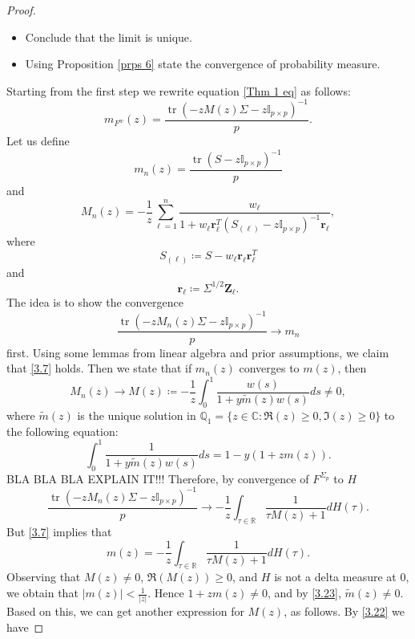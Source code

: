 \documentclass[a4paper,11pt]{book}
\theoremstyle{plain}
\theoremstyle{definition}
\newcommand{\MR}{\mathbb{R}}
\newcommand{\tr}{\operatorname{tr}}
\begin{document}
\begin{proof}
\begin{itemize}
    		\item Conclude that the limit is unique.
    		\item Using Proposition \ref{prps 6} state the convergence of probability measure.
    	\end{itemize}
    	Starting from the first step we rewrite equation \eqref{Thm 1 eq} as follows:
    	\[ m_{F^w}(z) = \frac{\tr(-zM(z)\Sigma -z\mathbb{I}_{p \times p})^{-1}}{p}. \]
    	Let us define
    	\[ m_n(z) = \frac{\tr(S-z\mathbb{I}_{p \times p})^{-1}}{p} \]
    	and
    	\[ M_n(z) = -\frac{1}{z} \sum_{\ell=1}^{n} \frac{w_\ell}{ 1+w_\ell \mathbf{r}_\ell^T (S_{(\ell)}-z\mathbb{I}_{p \times p})^{-1} \mathbf{r}_\ell},  \]
    	where
    	\[ S_{(\ell)} \coloneqq S - w_\ell \mathbf{r}_\ell \mathbf{r}_\ell^T \]
    	and 
    	\[ \mathbf{r}_\ell \coloneqq \Sigma^{1/2}\mathbf{Z}_\ell. \]
    	The idea is to show the convergence
    	\begin{equation} \label{3.7}
    	     \frac{\tr(-zM_n(z)\Sigma -z\mathbb{I}_{p \times p})^{-1}  }{p} \rightarrow m_n
    	\end{equation}
    	first. Using some lemmas from linear algebra and prior assumptions, we claim that \eqref{3.7} holds. Then we state that if $m_n(z)$ converges to $m(z)$, then
    	\begin{equation} \label{3.22}
    	 M_n(z) \rightarrow M(z) \coloneqq -\frac{1}{z} \int_{0}^{1} \frac{w(s)}{1+y\widetilde{m}(z)w(s) }ds \neq 0, 
    	\end{equation}
    	where $\widetilde{m}(z)$ is the unique solution in $\mathbb{Q}_1 = \{z \in \mathbb{C}: \Re(z) \geq 0, \Im(z) \geq 0\}$ to the following equation:
    	\begin{equation} \label{3.23}
    	\int_{0}^{1} \frac{1}{1 + y \widetilde{m}(z) w(s)} ds = 1 - y (1 + zm(z)).
    	\end{equation}
    	BLA BLA BLA EXPLAIN IT!!!
    	Therefore, by convergence of $F^{\Sigma_p}$ to $H$
    	\[ 
    	\frac{\tr(-zM_n(z)\Sigma -z\mathbb{I}_{p \times p})^{-1}  }{p} \rightarrow -\frac{1}{z} \int_{\tau \in \MR} \frac{1}{\tau M(z) + 1}dH(\tau). \]
    	But \eqref{3.7} implies that
    	\begin{equation} \label{3.27}
    		m(z) = -\frac{1}{z} \int_{\tau \in \MR} \frac{1}{\tau M(z) + 1}dH(\tau). 
    	\end{equation}
    	Observing that $M(z) \neq 0$, $\Re(M(z)) \geq 0$, and $H$ is not a delta measure at $0$, we obtain that $|m(z)| < \frac{1}{|z|}$. Hence $1+zm(z) \neq 0$, and by \eqref{3.23}, $\widetilde{m}(z) \neq 0$. Based on this, we can get another expression for $M(z)$, as follows. By \eqref{3.22} we have

\end{proof}
\end{document}
